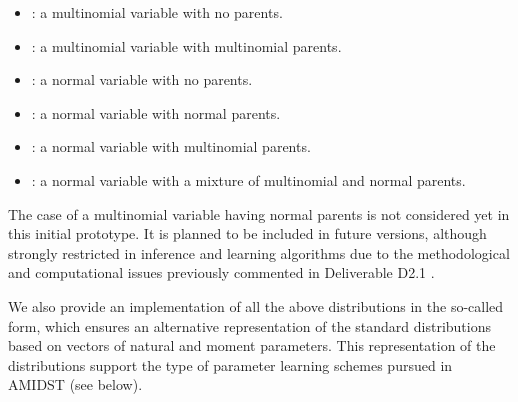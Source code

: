 \begin{itemize}
  \item {}: a multinomial variable with no parents.
  \item {}: a multinomial variable with multinomial parents.
  \item {}: a normal variable with no parents.
  \item {}: a normal variable with normal parents.
  \item {}: a normal variable with multinomial parents.
  \item {}: a normal variable with a mixture of multinomial and normal parents.
\end{itemize}

The case of a multinomial variable having normal parents is not considered yet in this initial prototype. It
is planned to be included in future versions, although strongly restricted in inference and learning
algorithms due to the methodological and computational issues previously commented in Deliverable D2.1 \cite{AMIDST-D21}. 

We also provide an implementation of all the above distributions in the so-called 
form, which ensures an alternative representation of the standard distributions based on vectors of natural
and moment parameters. This representation of the distributions support the type of parameter learning schemes
pursued in AMIDST (see below).


